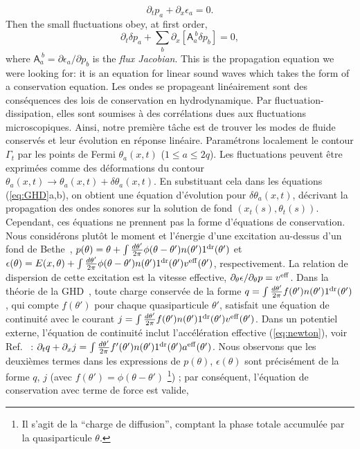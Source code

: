 \documentclass[twocolumn,amsfonts,showpacs,superscriptaddress]{revtex4-1}
\newcommand{\trad}[1]{\textcolor{myblue}{#1}}
\begin{document}
\begin{equation}\label{eq:ka}
	\partial_t p_a + \partial_x \epsilon_a = 0.
\end{equation}
Then the small fluctuations obey, at first order,
\begin{equation}\label{eq:deltaka}
	\partial_t \delta p_a + \sum_b\partial_x[\mathsf A_a^{~b} \delta p_b] = 0,
\end{equation}
where $ \mathsf A_a^{~b} = \partial \epsilon_a/\partial p_b$ is the {\it flux Jacobian}. This is the propagation equation we were looking for: it is an equation for linear sound waves which takes the form of a conservation equation.
\trad{\vspace{0.1cm} \noindent {\bf\em Ondes sonores dans la GHD à entropie nulle.}\; Les ondes se propageant linéairement sont des conséquences des lois de conservation en hydrodynamique. Par fluctuation-dissipation, elles sont soumises à des corrélations dues aux fluctuations microscopiques. Ainsi, notre première tâche est de trouver les modes de fluide conservés et leur évolution en réponse linéaire. Paramétrons localement le contour $\Gamma_t$ par les points de Fermi $\theta_a(x,t)$ ($1 \leq a \leq 2q$). Les fluctuations peuvent être exprimées comme des déformations du contour $\theta_a(x,t)\rightarrow \theta_a(x,t)+\delta \theta_a(x,t)$. En substituant cela dans les équations (\ref{eq:GHD}a,b), on obtient une équation d'évolution pour $\delta \theta_a(x,t)$, décrivant la propagation des ondes sonores sur la solution de fond $(x_t(s), \theta_t(s))$. Cependant, ces équations ne prennent pas la forme d'équations de conservation.
Nous considérons plutôt le moment et l'énergie d'une excitation au-dessus d'un fond de Bethe~\cite{korepin1997quantum}, $p(\theta) = \theta + \int \frac{d\theta'}{2\pi} \phi(\theta-\theta') n(\theta')1^{\rm dr}(\theta')$ et $\epsilon(\theta) = E(x,\theta) + \int \frac{d\theta'}{2\pi} \phi(\theta-\theta')n(\theta')1^{\rm dr}(\theta')v^{\rm eff}(\theta')$, respectivement. La relation de dispersion de cette excitation est la vitesse effective, $\partial_\theta \epsilon / \partial_\theta p = v^{\rm eff}$. Dans la théorie de la GHD~\cite{bertini2016transport,castro2016emergent}, toute charge conservée de la forme $q = \int \frac{d \theta'}{2\pi} f(\theta') n(\theta')1^{\rm dr} (\theta')$, qui compte $f(\theta')$ pour chaque quasiparticule $\theta'$, satisfait une équation de continuité avec le courant $j = \int \frac{d \theta'}{2\pi} f(\theta') n(\theta') 1^{\rm dr} (\theta') v^{\rm eff}(\theta')$. Dans un potentiel externe, l'équation de continuité inclut l'accélération effective (\ref{eq:newton}), voir Ref.~\cite{doyon2017note} : $\partial_t q + \partial_x j = \int \frac{d \theta'}{2\pi} f'(\theta') n(\theta') 1^{\rm dr} (\theta') a^{\rm eff}(\theta')$. Nous observons que les deuxièmes termes dans les expressions de $p(\theta)$, $\epsilon(\theta)$ sont précisément de la forme $q$, $j$ (avec $f(\theta') = \phi(\theta-\theta')$ \footnote{Il s'agit de la ``charge de diffusion'', comptant la phase totale accumulée par la quasiparticule $\theta$.}) ; par conséquent, l'équation de conservation avec terme de force est valide,
}
\end{document}
